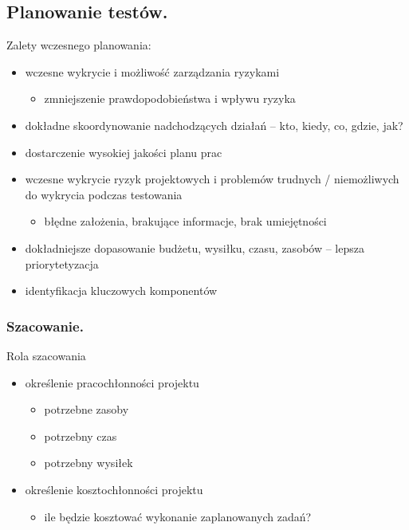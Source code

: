 \documentclass[../main.tex]{subfiles}
\begin{document}
    \subsection{Planowanie testów.}

    Zalety wczesnego planowania:
    \begin{itemize}
        \item wczesne wykrycie i możliwość zarządzania ryzykami
        \begin{itemize}
            \item zmniejszenie prawdopodobieństwa i wpływu ryzyka
        \end{itemize}
        \item dokładne skoordynowanie nadchodzących działań – kto, kiedy, co, gdzie, jak?
        \item dostarczenie wysokiej jakości planu prac
        \item wczesne wykrycie ryzyk projektowych i problemów trudnych /
        niemożliwych do wykrycia podczas testowania
        \begin{itemize}
            \item błędne założenia, brakujące informacje, brak umiejętności
        \end{itemize}
        \item dokładniejsze dopasowanie budżetu, wysiłku, czasu, zasobów – lepsza priorytetyzacja
        \item identyfikacja kluczowych komponentów
    \end{itemize}

    \subsubsection{Szacowanie.}

    Rola szacowania
    \begin{itemize}
        \item określenie pracochłonności projektu
        \begin{itemize}
            \item potrzebne zasoby
            \item potrzebny czas
            \item potrzebny wysiłek
        \end{itemize}
        \item określenie kosztochłonności projektu
        \begin{itemize}
            \item ile będzie kosztować wykonanie zaplanowanych zadań?
        \end{itemize}
    \end{itemize}
\end{document}
